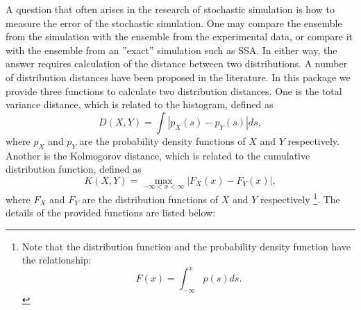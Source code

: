 \documentclass[12pt]{article}
\begin{document}
A question that often arises in the research of stochastic simulation is how to measure
the error of the stochastic simulation. One may compare the ensemble from
the simulation with the ensemble from the experimental data, or compare it with
the ensemble from an ''exact'' simulation such as SSA. In either way, the answer
requires calculation of the distance between two distributions.
A number of distribution
distances have been proposed in the literature. In this package we provide three functions
to calculate two distribution distances. One is the total variance distance, which is
related to the histogram, defined as
\begin{equation} \label{d_distance}
        D(X, Y) = \int | p_X(s) - p_Y(s) | ds,
\end{equation}
where $p_X$ and $p_Y$ are the probability density functions of $X$ and $Y$ respectively.
Another is the Kolmogorov distance, which is related to
the cumulative distribution function, defined as
\begin{equation}
        K(X, Y) = \max_{-\infty < x < \infty} |F_X(x) - F_Y(x)|,
\end{equation}
where $F_X$ and $F_Y$ are the distribution functions of $X$ and $Y$ respectively
\footnote{
Note that the distribution function and the probability density function have
the relationship:
\begin{equation}
    F(x) = \int_{-\infty}^x p(s) ds.
\end{equation} }.
The details of the provided functions are listed below:
\end{document}
